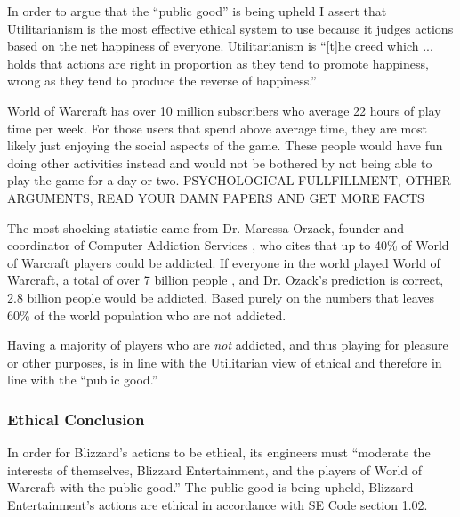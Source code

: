\documentclass[11pt]{article}
\begin{document}
\begin{multicols}{2}
In order to argue that the ``public good'' is being upheld I assert that Utilitarianism is the most effective ethical system to use because it judges actions based on the net happiness of everyone. Utilitarianism is ``[t]he creed which ... holds that actions are right in proportion as they tend to promote happiness, wrong as they tend to produce the reverse of happiness.'' \cite{Utilitarianism}

World of Warcraft has over 10 million subscribers \cite{WoWPlayerCount} who average 22 hours of play time per week. \cite{PlayerMotivations} For those users that spend above average time, they are most likely just enjoying the social aspects of the game. \cite{ExcessiveUseForSocialAspects} These people would have fun doing other activities instead and would not be bothered by not being able to play the game for a day or two. \cite{ExcessiveUseForSocialAspects} PSYCHOLOGICAL FULLFILLMENT, OTHER ARGUMENTS, READ YOUR DAMN PAPERS AND GET MORE FACTS

The most shocking statistic came from Dr. Maressa Orzack, founder and coordinator of Computer Addiction Services \cite{CompAddictionServices}, who cites that up to 40\% of World of Warcraft players could be addicted. \cite{FortyPercentAddicted} If everyone in the world played World of Warcraft, a total of over 7 billion people \cite{WorldPopulation}, and Dr. Ozack's prediction is correct, 2.8 billion people would be addicted. Based purely on the numbers that leaves 60\% of the world population who are not addicted.

Having a majority of players who are \emph{not} addicted, and thus playing for pleasure or other purposes, is in line with the Utilitarian view of ethical and therefore in line with the ``public good.''

\subsubsection{Ethical Conclusion}
In order for Blizzard's actions to be ethical, its engineers must ``moderate the interests of themselves, Blizzard Entertainment, and the players of World of Warcraft with the public good.''
The public good is being upheld, Blizzard Entertainment's actions are ethical in accordance with SE Code section 1.02.

\begin{comment}
\subsection{SE Code Section 2.07\\Identify, document, and report significant issues of social concern, of which they are aware, in software or related documents, to the employer or the client.}
DICE Interview? Gamastura, sounded concerned.


\end{comment}
\end{multicols}
\end{document}
